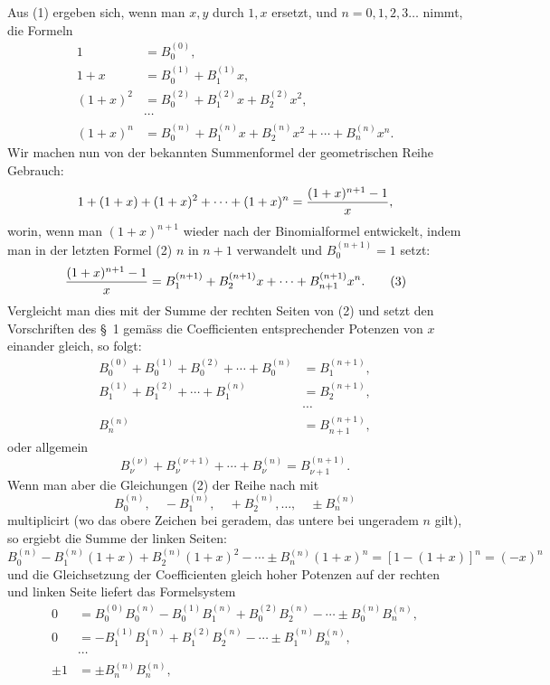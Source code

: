 \documentclass[11pt]{article}
\begin{document}
Aus (1) ergeben sich, wenn man $x,y$ durch $1,x$ ersetzt, und $n=0,1,2,3\ldots$ nimmt, die Formeln
\begin{equation}
\begin{aligned}
1&=B_0^{(0)},\\
1+x&=B_0^{(1)}+B_1^{(1)}x,\\
(1+x)^2&=B_0^{(2)}+B_1^{(2)}x+B_2^{(2)}x^2,\\
&\cdots\\
(1+x)^n&=B_0^{(n)}+B_1^{(n)}x+B_2^{(n)}x^2+\cdots+B_n^{(n)}x^n.
\end{aligned}
\tag{2}
\end{equation}
Wir machen nun von der bekannten Summenformel der geometrischen Reihe Gebrauch:
\[
 1+(1+x)+(1+x)^2+\cdots+(1+x)^n={(1+x)^{n+1}-1\over x},
\]
worin, wenn man $(1+x)^{n+1}$ wieder nach der Binomialformel entwickelt, indem man in der letzten Formel (2) $n$ in $n+1$ verwandelt und $B_0^{(n+1)}=1$ setzt:
\begin{equation}
{(1+x)^{n+1}-1\over x}=B_1^{(n+1)}+B_2^{(n+1)}x+\cdots+B_{n+1}^{(n+1)}x^n.
\tag{3}
\end{equation}
Vergleicht man dies mit der Summe der rechten Seiten von (2) und setzt den Vorschriften des \S~1 gemäss die Coefficienten entsprechender Potenzen von $x$ einander gleich, so folgt:
\begin{equation}
\begin{aligned}
 B_0^{(0)}+B_0^{(1)}+B_0^{(2)}+\cdots+B_0^{(n)}&=B_1^{(n+1)},\\
 B_1^{(1)}+B_1^{(2)}+\cdots+B_1^{(n)}&=B_2^{(n+1)},\\
&\cdots\\
 B_n^{(n)}&=B_{n+1}^{(n+1)},
\end{aligned}
\tag{4}
\end{equation}
oder allgemein
\begin{equation}
 B_\nu^{(\nu)}+B_\nu^{(\nu+1)}+\cdots+B_\nu^{(n)}=B_{\nu+1}^{(n+1)}.
\tag{5}
\end{equation}
Wenn man aber die Gleichungen (2) der Reihe nach mit
\[
B_0^{(n)},\quad -B_1^{(n)},\quad +B_2^{(n)},\ldots,\quad \pm B_n^{(n)}
\]
multiplicirt (wo das obere Zeichen bei geradem, das untere bei ungeradem $n$ gilt), so ergiebt die Summe der linken Seiten:
\[
 B_0^{(n)}-B_1^{(n)}(1+x)+B_2^{(n)}(1+x)^2-\cdots\pm B_n^{(n)}(1+x)^n
 =[1-(1+x)]^n=(-x)^n
\]
und die Gleichsetzung der Coefficienten gleich hoher Potenzen auf der rechten und linken Seite liefert das Formelsystem
\begin{equation}
\begin{aligned}
0&=B_0^{(0)}B_0^{(n)}-B_0^{(1)}B_1^{(n)}+B_0^{(2)}B_2^{(n)}-\cdots\pm B_0^{(n)}B_n^{(n)},\\
0&=-B_1^{(1)}B_1^{(n)}+B_1^{(2)}B_2^{(n)}-\cdots\pm B_1^{(n)}B_n^{(n)},\\
&\cdots\\
\pm 1&=\pm B_n^{(n)}B_n^{(n)},
\end{aligned}
\tag{6}
\end{equation}
\end{document}
